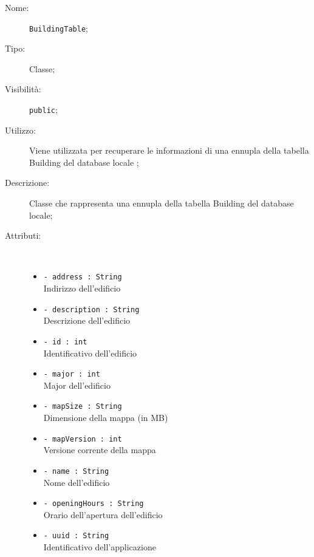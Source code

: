 \documentclass[../DefinizioneDiProdotto.tex]{subfiles}
\begin{document}
    \begin{description}
\item[Nome:] \texttt{BuildingTable};
\item[Tipo:] Classe;
\item[Visibilità:] \texttt{public};
\item[Utilizzo:] Viene utilizzata per recuperare le informazioni di una ennupla della tabella Building del database locale ;
\item[Descrizione:] Classe che rappresenta una ennupla della tabella Building del database locale;
\item[Attributi:] \
\begin{itemize}
\item \texttt{- address : String}\\
Indirizzo dell'edificio

\item \texttt{- description : String}\\
Descrizione dell'edificio

\item \texttt{- id : int}\\
Identificativo dell'edificio

\item \texttt{- major : int}\\
Major dell'edificio

\item \texttt{- mapSize : String}\\
Dimensione della mappa (in MB)

\item \texttt{- mapVersion : int}\\
Versione corrente della mappa

\item \texttt{- name : String}\\
Nome dell'edificio

\item \texttt{- openingHours : String}\\
Orario dell'apertura dell'edificio

\item \texttt{- uuid : String}\\
Identificativo dell'applicazione


\end{itemize}
\end{description}
\end{document}

